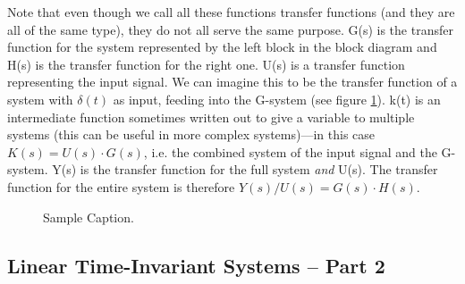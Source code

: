 \begin{newtext}
Note that even though we call all these functions transfer functions (and they are all of the same type), they do not all serve the same purpose. G(s) is the transfer function for the system represented by the left block in the block diagram and H(s) is the transfer function for the right one. U(s) is a transfer function representing the input signal. We can imagine this to be the transfer function of a system with $\delta(t)$ as input, feeding into the G-system (see figure \ref{fig:tfexext}). k(t) is an intermediate function sometimes written out to give a variable to multiple systems (this can be useful in more complex systems)---in this case $K(s)=U(s)\cdot G(s)$, i.e. the combined system of the input signal and the G-system. Y(s) is the transfer function for the full system \textit{and} U(s). The transfer function for the entire system is therefore $Y(s)/U(s)=G(s)\cdot H(s)$.
\begin{figure}[H]
\centering
{}
\caption{Sample Caption.}
\label{fig:tfexext}
\end{figure}
\end{newtext}

\subsection{Linear Time-Invariant Systems -- Part 2}\label{sec:lti}

